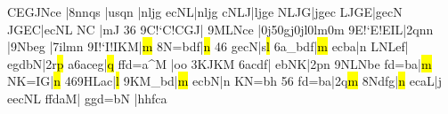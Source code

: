 \def\atnextline{\autolines{23}2{\testpgs}}\relax
\barre\znotes{}\enotes\relax
\Accord CEGJNce\relax
\temps\notes|\qsk{}\qqbbu8nnqs\enotes
\temps\notes|usqn\enotes
\temps\notes|nljg\enotes
\barre\notes{}ecNL|nljg\enotes
\temps\notes{}cNLJ|ljge\enotes
\temps\notes{}NLJG|jgec\enotes
\temps\notes{}LJGE|gecN\enotes
\temps\notes{}JGEC|ecNL\enotes
\normalnotesize
\temps\notes\pointdorgue N\relax\boqu C\DEP\qsk
  |\pointdorgue m\qu J\enotes
\suspmorceau
\def\interfacteur{9}\computewidths
\preprmorceau\normalnotesize{}36\relax
\Notes{}\qqbH9C{!`C}{!C}GJ|\enotes
\temps\Notes\qqbH9MLNce\enotes
\temps\Notes|\ibu0j5\qh0g\lsf j\qh0j\lsf l\qh0l\lsf m\tqh0m\enotes
\barre\Notes\qqbH9E{!`E}{!E}IL|\Ilegu2q\usf n\whp n\enotes
\temps\Notes|\qqbl9Nbeg\enotes
\temps\Notes|\qqbl7ilmn\enotes
\deuxtemps
\changecontext\Notes\qqbH9I{!`I}{!I}KM|\hl m\enotes
\temps\Notes\qqbl8N{=b}df|\hl n\enotes
\barre{}46\relax
\Notes{}gecN|\zcharnote s{\vrule width 0pt height 7pt}\hl l\enotes
\temps\Notes\qqbl6a{_b}df|\hl m\enotes
\barre\Notes{}ecba|\wh n\enotes
\temps\Notes{}LNLef|\sk\sk\sk{}\enotes
\barre\Notes{}egdbN|\Ilegu2r\hl p\enotes
\temps\Notes\bigna a\qqbl6aceg|\hl q\enotes
\troistemps\changecontext\Notes\bigaccid\sh ffd{=a}{^M}\relax
|\bigna o\wh o\enotes
\temps\Notes\qqbu3KJKM\enotes
\temps\Notes\qqbl6acd{f}|\hpause\enotes
\deuxtemps\changecontext\Notes{}ebNK|\Ilegu2p\wh n\enotes
\temps\Notes\qqbH9NLNbe\enotes
\barre\Notes\bigaccid{}fd{=b}a|\hl m\enotes
\temps\Notes\bigaccid{}NK{=I}G|\hl n\enotes
\barre{}46\Notes\qqbl9HLac|\hl l\enotes
\temps\Notes\qqbl9KM{_b}d|\hl m\enotes
\barre\Notes{}ecbN|\wh n\enotes
\temps\Notes{}KN{=b}h\enotes
\barre{}56\relax
\Notes{}fd{=b}a|\Ilegu2q\hl m\enotes
\temps\Notes\qqbl8Ndfg|\hl n\enotes
\barre\Notes\Qqbl ecaL|\wh j\enotes
\temps\Notes\usf e\Qqbl ecNL\enotes
\barre\Notes\usf f\Qqbl fdaM|\sk\sk\sk\pause\enotes
\temps\Notes\usf g\Qqbl gd{=b}N\enotes
\barre\Notes\sk\sk\sk\pause|\lsf h\Qqbu hfca\enotes
